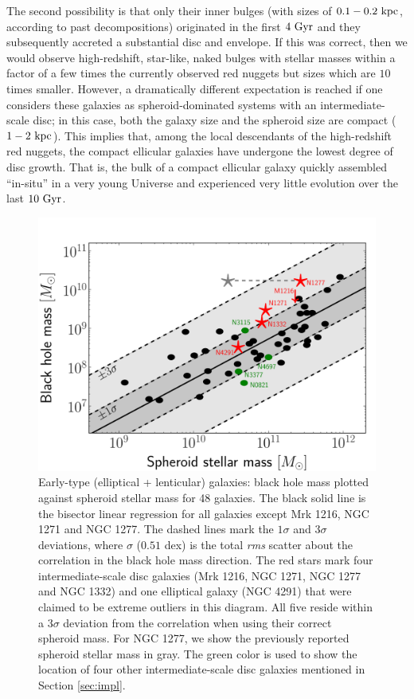 \documentclass[useAMS,usenatbib,article]{mn2e}
\begin{document}
The second possibility is that only their inner bulges (with sizes of $0.1-0.2~\rm kpc$, 
according to past decompositions) originated in the first $4~\rm Gyr$ 
and they subsequently accreted a substantial disc and envelope. 
If this was correct, then we would observe high-redshift, star-like, naked bulges with stellar masses 
within a factor of a few times the currently observed red nuggets but sizes which are $10$ times smaller. 
However, a dramatically different expectation is reached 
if one considers these galaxies as spheroid-dominated systems with an intermediate-scale disc; 
in this case, both the galaxy size and the spheroid size are compact ($1-2~\rm kpc$). 
This implies that, among the local descendants of the high-redshift red nuggets, 
the compact ellicular galaxies have undergone the lowest degree of disc growth. 
That is, the bulk of a compact ellicular galaxy quickly assembled ``in-situ'' in a very young Universe 
and experienced very little evolution over the last $10~\rm Gyr$.

\begin{figure}
\begin{center}
\includegraphics[width=\columnwidth]{images/mm.pdf}
\caption{Early-type (elliptical + lenticular) galaxies: 
black hole mass plotted against spheroid stellar mass for 48 galaxies. 
The black solid line is the bisector linear regression for all galaxies except Mrk 1216, NGC 1271 and NGC 1277. 
The dashed lines mark the $1\sigma$ and $3\sigma$ deviations, 
where $\sigma$ ($0.51$ dex) is the total \emph{rms} scatter about the correlation in the black hole mass direction. 
The red stars mark four intermediate-scale disc galaxies (Mrk 1216, NGC 1271, NGC 1277 and NGC 1332) and one elliptical galaxy (NGC 4291) 
that were claimed to be extreme outliers in this diagram. 
All five reside within a $3\sigma$ deviation from the correlation when using their correct spheroid mass. 
For NGC 1277, we show the previously reported spheroid stellar mass \citep{vandenbosch2012} in gray. 
The green color is used to show the location of four other intermediate-scale disc galaxies mentioned in Section \ref{sec:impl}.}
\label{fig:mm}
\end{center}
\end{figure}
\end{document}
